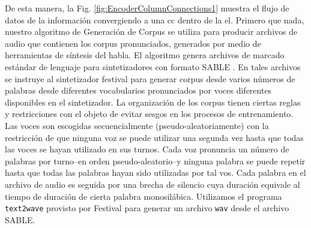 {De esta manera, la Fig. \ref{fig:EncoderColumnConnections1} muestra el flujo de datos de la información convergiendo a una \gls{cc} dentro de la \gls{el}.
Primero que nada, nuestro algoritmo de Generación de Corpus se utiliza para producir archivos de audio que contienen los corpus pronunciados, generados por medio de herramientas de síntesis del habla.
El algoritmo genera archivos de marcado estándar de lenguaje para sintetizadores con formato SABLE \cite{sable}.
En tales archivos se instruye al sintetizador \gls{festival} para generar corpus desde varios números de palabras desde diferentes vocabularios pronunciados por voces diferentes disponibles en el sintetizador. 
La organización de los corpus tienen ciertas reglas y restricciones con el objeto de evitar sesgos en los procesos de entrenamiento.
Las voces son escogidas secuencialmente (pseudo-aleatoriamente) con la restricción de que ninguna voz se puede utilizar una segunda vez hasta que todas las voces se hayan utilizado en sus turnos.
Cada voz pronuncia un número de palabras por turno--en orden pseudo-aleatorio--y ninguna palabra se puede repetir hasta que todas las palabras hayan sido utilizadas por tal vos.
Cada palabra en el archivo de audio es seguida por una brecha de silencio cuya duración equivale al tiempo de duración de cierta palabra monosilábica.
Utilizamos el programa \texttt{text2wave} provisto por Festival para generar un archivo \texttt{wav} desde el archivo SABLE.

}
